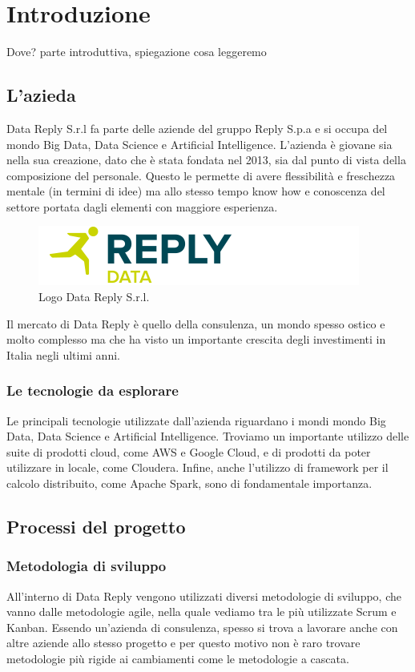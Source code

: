 \chapter{Introduzione}
\label{Introduzione}
Dove?
parte introduttiva, spiegazione cosa leggeremo
\section{L'azieda}
Data Reply S.r.l fa parte delle aziende del gruppo Reply S.p.a e si occupa del mondo Big Data, Data Science e Artificial Intelligence. L'azienda è giovane sia nella sua creazione, dato che è stata fondata nel 2013, sia dal punto di vista della composizione del personale. Questo le permette di avere flessibilità e freschezza mentale (in termini di idee) ma allo stesso tempo know how e conoscenza del settore portata dagli elementi con maggiore esperienza.

\begin{figure}
	\includegraphics[width=\textwidth]{figures/data-reply-logo}
	\caption[Short figure name.]{Logo Data Reply S.r.l.
		\label{fig:logoDataReply}}
\end{figure}

Il mercato di Data Reply è quello della consulenza, un mondo spesso ostico e molto complesso ma che ha visto un importante crescita degli investimenti in Italia negli ultimi anni.
\subsection{Le tecnologie da esplorare}
Le principali tecnologie utilizzate dall'azienda riguardano i mondi mondo Big Data, Data Science e Artificial Intelligence. Troviamo un importante utilizzo delle suite di prodotti cloud, come \gls{AWS} e \gls{Google Cloud}, e di prodotti da poter utilizzare in locale, come \gls{Cloudera}. Infine, anche l'utilizzo di framework per il calcolo distribuito, come \gls{Apache Spark}, sono di fondamentale importanza.
\section{Processi del progetto}
\subsection{Metodologia di sviluppo}
All'interno di Data Reply vengono utilizzati diversi metodologie di sviluppo, che vanno dalle metodologie agile, nella quale vediamo tra le più utilizzate \gls{Scrum} e \gls{Kanban}. Essendo un'azienda di consulenza, spesso si trova a lavorare anche con altre aziende allo stesso progetto e per questo motivo non è raro trovare metodologie più rigide ai cambiamenti come le metodologie a cascata.
